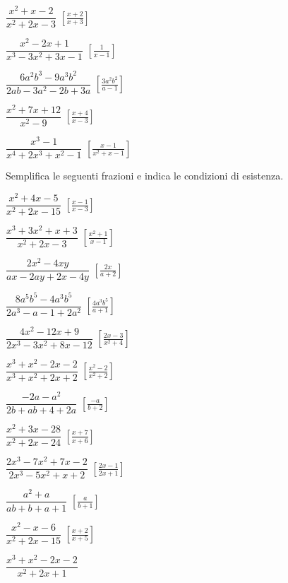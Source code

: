 \begin{esercizio}[\Ast]
\begin{multicols}{2}
\begin{enumeratea}
 \item $\dfrac{x^{2}+x-2}{x^{2}+2x-3}$
  \hfill $\left[\frac{x+2}{x+3}\right]$
 \item $\dfrac{x^{2}-2x+1}{x^{3}-3x^{2}+3x-1}$
  \hfill $\left[\frac{1}{x-1}\right]$
 \item $\dfrac{6a^{2}b^{3}-9a^{3}b^{2}}{2ab-3a^{2}-2b+3a}$
  \hfill $\left[\frac{3a^{2}b^{2}}{a-1}\right]$
 \item $\dfrac{x^{2}+7x+12}{x^{2}-9}$
  \hfill $\left[\frac{x+4}{x-3}\right]$
 \item $\dfrac{x^{3}-1}{x^{4}+2x^{3}+x^{2}-1}$
  \hfill $\left[\frac{x-1}{x^2+x-1}\right]$
\end{enumeratea}
\end{multicols}
\end{esercizio}

\begin{esercizio}[\Ast]
\label{ese:19.10}
Semplifica le seguenti frazioni e indica le condizioni di esistenza.
\begin{multicols}{2}
\begin{enumeratea}
 \item $\dfrac{x^{2}+4x-5}{x^{2}+2x-15}$
  \hfill $\left[\frac{x-1}{x-3}\right]$
 \item $\dfrac{x^{3}+3x^{2}+x+3}{x^{2}+2x-3}$
  \hfill $\left[\frac{x^2+1}{x-1}\right]$
 \item $\dfrac{2x^{2}-4xy}{ax-2ay+2x-4y}$
  \hfill $\left[\frac{2x}{a+2}\right]$
 \item $\dfrac{8a^{5}b^{5}-4a^{3}b^{5}}{2a^{3}-a-1+2a^{2}}$
  \hfill $\left[\frac{4a^{3}b^{5}}{a+1}\right]$
 \item $\dfrac{4x^{2}-12x+9}{2x^{3}-3x^{2}+8x-12}$
  \hfill $\left[\frac{2x-3}{x^{2}+4}\right]$
 \item $\dfrac{x^{3}+x^{2}-2x-2}{x^{3}+x^{2}+2x+2}$
  \hfill $\left[\frac{x^2-2}{x^2+2}\right]$
 \item $\dfrac{-2a-a^{2}}{2b+ab+4+2a}$
  \hfill $\left[\frac{-a}{b+2}\right]$
 \item $\dfrac{x^{2}+3x-28}{x^{2}+2x-24}$
  \hfill $\left[\frac{x+7}{x+6}\right]$
 \item $\dfrac{2x^{3}-7x^{2}+7x-2}{2x^{3}-5x^{2}+x+2}$
  \hfill $\left[\frac{2x-1}{2x+1}\right]$
 \item $\dfrac{a^{2}+a}{ab+b+a+1}$
  \hfill $\left[\frac{a}{b+1}\right]$
 \item $\dfrac{x^{2}-x-6}{x^{2}+2x-15}$
  \hfill $\left[\frac{x+2}{x+5}\right]$
 \item $\dfrac{x^{3}+x^{2}-2x-2}{x^{2}+2x+1}$

\end{enumeratea}
\end{multicols}
\end{esercizio}
